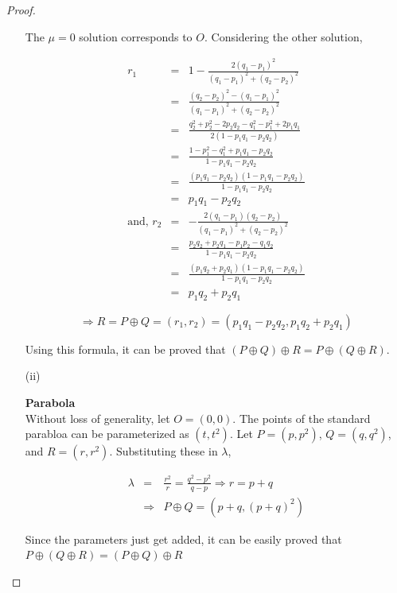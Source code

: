 \begin{proof}
\begin{itemize}
{        The $\mu=0$ solution corresponds to $O$. Considering the other solution,

        \begin{eqnarray*}
          r_1&=&1-\frac{2(q_1-p_1)^2}{(q_1-p_1)^2+(q_2-p_2)^2}\\
             &=&\frac{(q_2-p_2)^2-(q_1-p_1)^2}{(q_1-p_1)^2+(q_2-p_2)^2}\\
             &=&\frac{q_2^2+p_2^2-2p_2q_2-q_1^2-p_1^2+2p_1q_1}{2(1-p_1q_1-p_2q_2)}\\
             &=&\frac{1-p_1^2-q_1^2+p_1q_1-p_2q_2}{1-p_1q_1-p_2q_2}\\
             &=&\frac{(p_1q_1-p_2q_2)(1-p_1q_1-p_2q_2)}{1-p_1q_1-p_2q_2}\\
             &=&p_1q_1-p_2q_2\\
          \text{and, }
          r_2&=&-\frac{2(q_1-p_1)(q_2-p_2)}{(q_1-p_1)^2+(q_2-p_2)^2}\\
             &=&\frac{p_2q_2+p_2q_1-p_1p_2-q_1q_2}{1-p_1q_1-p_2q_2}\\
             &=&\frac{(p_1q_2+p_2q_1)(1-p_1q_1-p_2q_2)}{1-p_1q_1-p_2q_2}\\
             &=&p_1q_2+p_2q_1
        \end{eqnarray*}

        $$\Rightarrow R=P\oplus Q=(r_1,r_2)=(p_1q_1-p_2q_2,p_1q_2+p_2q_1)$$

        Using this formula, it can be proved that $(P\oplus Q)\oplus R=P\oplus(Q\oplus R)$.
      }

    \item[(ii)]{\textbf{Parabola}\\
      Without loss of generality, let $O=(0,0)$. The points of the standard parabloa can
      be parameterized as $(t,t^2)$. Let $P=(p,p^2)$, $Q=(q,q^2)$, and $R=(r,r^2)$.
      Substituting these in $\lambda$,

      \begin{eqnarray*}
        \lambda&=&\frac{r^2}{r}=\frac{q^2-p^2}{q-p} \Rightarrow r=p+q \\
        &\Rightarrow&P\oplus Q=(p+q,(p+q)^2)
      \end{eqnarray*}

      Since the parameters just get added, it can be easily proved that\\
      $P\oplus(Q\oplus R)=(P\oplus Q)\oplus R$

}
\end{itemize}
\end{proof}
